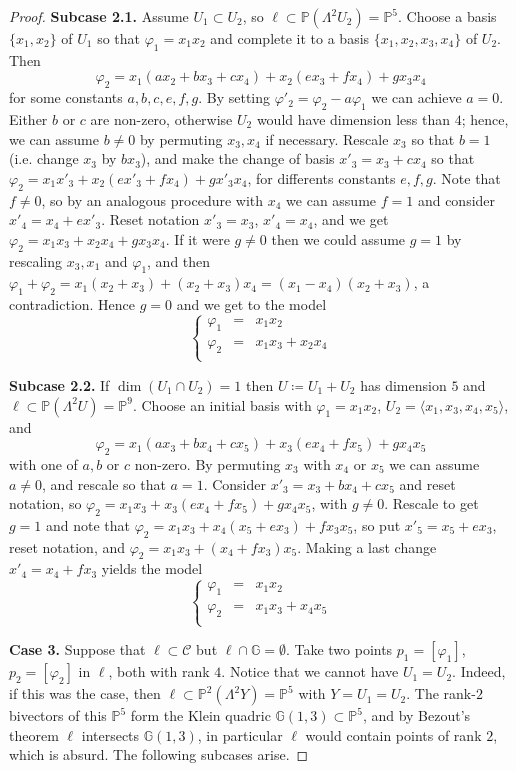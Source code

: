 \documentclass[10pt,reqno]{amsart}
\newcommand{\la}{\langle}
\newcommand{\ra}{\rangle}
\newcommand{\cC}{{\mathcal{C}}}
\newcommand{\GG}{\mathbb{G}}
\newcommand{\PP}{\mathbb P}
\newcommand{\f}{\varphi}
\renewcommand{\L}{\Lambda}
\theoremstyle{definition}
\begin{document}
\begin{proof}
\item \textbf{Subcase 2.1.} Assume $U_1 \subset U_2$, so $\ell \subset \PP(\L^2 U_2)=\PP^5$. Choose a basis $\{x_1,x_2\}$ of $U_1$ so that $\f_1=x_1x_2$ and complete it to a basis $\{x_1,x_2,x_3,x_4\}$ of $U_2$. Then 
\[
\f_2=x_1(ax_2 + bx_3+cx_4) + x_2 (ex_3+fx_4) + gx_3x_4
\]
for some constants $a,b,c,e,f,g$. By setting $\f'_2=\f_2-a\f_1$ we can achieve $a=0$. Either $b$ or $c$ are non-zero, otherwise $U_2$ would have dimension less than $4$; hence, we can assume $b \ne 0$ by permuting $x_3,x_4$ if necessary. Rescale $x_3$ so that $b=1$ (i.e. change $x_3$ by $bx_3$), and make the change of basis $x'_3=x_3+cx_4$ so that $\f_2=x_1x'_3 + x_2 (ex'_3+fx_4) + gx'_3x_4$, for differents constants $e,f,g$. Note that $f\ne 0$, so by an analogous procedure with $x_4$ we can assume $f=1$ and consider $x'_4=x_4+ex'_3$. Reset notation $x'_3=x_3$, $x'_4=x_4$, and we get $\f_2=x_1x_3 + x_2 x_4 + gx_3x_4$. 
If it were $g \ne 0$ then we could assume $g=1$ by rescaling $x_3, x_1$ and $\f_1$, and then $\f_1+\f_2=x_1(x_2+x_3)+(x_2+x_3)x_4=(x_1-x_4)(x_2+x_3)$, a contradiction. Hence $g=0$ and we get to the model 
\[
\left\{\begin{array}{ccl}
 \f_1 & = & x_1x_2\\
 \f_2 & = & x_1x_3+x_2x_4\\
\end{array}\right.
\]

\item \textbf{Subcase 2.2.} If $\dim(U_1 \cap U_2)=1$ then $U\coloneqq U_1 + U_2$ has dimension $5$ and $\ell\subset \PP(\L^2U)=\PP^9$. Choose an initial basis with $\f_1=x_1x_2$, $U_2=\la x_1, x_3, x_4, x_5 \ra$, and
\[
\f_2=x_1(ax_3 + bx_4+cx_5) + x_3 (ex_4+fx_5) + gx_4x_5
\]
with one of $a,b$ or $c$ non-zero. By permuting $x_3$ with $x_4$ or $x_5$ we can assume $a \ne 0$, and rescale so that $a=1$. Consider $x'_3=x_3 + bx_4+cx_5$ and reset notation, so $\f_2=x_1x_3+x_3(ex_4+fx_5)+gx_4x_5$, with $g \ne 0$. Rescale to get $g=1$ and note that $\f_2=x_1x_3 + x_4(x_5+ex_3)+fx_3x_5$, so put $x'_5=x_5+ex_3$, reset notation, and $\f_2=x_1x_3+(x_4+fx_3)x_5$. Making a last change $x'_4=x_4+fx_3$ yields the model 
\[
\left\{\begin{array}{ccl}
 \f_1 & = & x_1x_2\\
 \f_2 & = & x_1x_3+x_4x_5\\
\end{array}\right.
\]

\item \textbf{Case 3.} Suppose that $\ell \subset \cC$ but $\ell\cap\GG=\emptyset$. Take two points $p_1=[\f_1]$, $p_2=[\f_2]$ in $\ell$, both with rank $4$. Notice that we cannot have $U_1=U_2$. Indeed, if this was the case, then $\ell \subset \PP^2(\L^2 Y)=\PP^5$ with $Y=U_1=U_2$. The rank-$2$ bivectors of this $\PP^5$ form the Klein quadric $\GG(1,3) \subset \PP^5$, and by Bezout's theorem $\ell$ intersects $\GG(1,3)$, in particular $\ell$ would contain points of rank $2$, which is absurd. The following subcases arise.


\end{proof}
\end{document}
